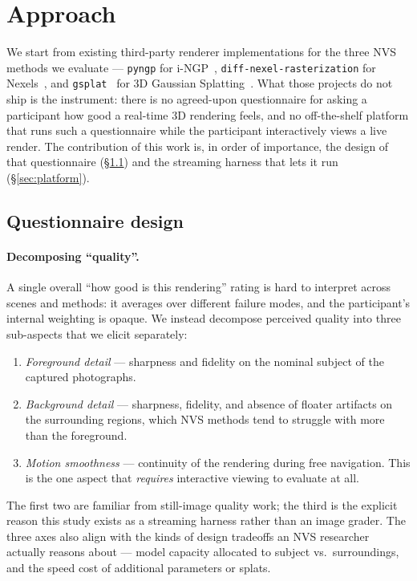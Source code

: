 
\section{Approach}
\label{sec:approach}

We start from existing third-party renderer implementations for the
three NVS methods we evaluate --- \texttt{pyngp} for
i-NGP~\citep{mueller2022instantngp},
\texttt{diff-nexel-rasterization} for Nexels~\citep{nexels}, and
\texttt{gsplat}~\citep{ye2024gsplat} for 3D Gaussian
Splatting~\citep{kerbl20233dgs}. What those projects do not ship is the
instrument: there is no agreed-upon questionnaire for asking a
participant how good a real-time 3D rendering feels, and no
off-the-shelf platform that runs such a questionnaire while the
participant interactively views a live render. The contribution of this
work is, in order of importance, the design of that questionnaire
(\S\ref{sec:questionnaire}) and the streaming harness that lets it run
(\S\ref{sec:platform}).

\subsection{Questionnaire design}
\label{sec:questionnaire}

\paragraph{Decomposing ``quality''.}
A single overall ``how good is this rendering'' rating is hard to
interpret across scenes and methods: it averages over different failure
modes, and the participant's internal weighting is opaque. We instead
decompose perceived quality into three sub-aspects that we elicit
separately:
\begin{enumerate}
    \item \emph{Foreground detail} --- sharpness and fidelity on the
    nominal subject of the captured photographs.
    \item \emph{Background detail} --- sharpness, fidelity, and absence
    of floater artifacts on the surrounding regions, which NVS methods
    tend to struggle with more than the foreground.
    \item \emph{Motion smoothness} --- continuity of the rendering during
    free navigation. This is the one aspect that \emph{requires}
    interactive viewing to evaluate at all.
\end{enumerate}
The first two are familiar from still-image quality work; the third is
the explicit reason this study exists as a streaming harness rather than
an image grader. The three axes also align with the kinds of design
tradeoffs an NVS researcher actually reasons about --- model capacity
allocated to subject vs.\ surroundings, and the speed cost of additional
parameters or splats.

